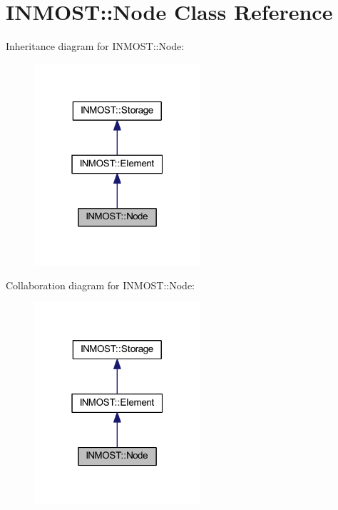 \hypertarget{classINMOST_1_1Node}{\section{I\-N\-M\-O\-S\-T\-:\-:Node Class Reference}
\label{classINMOST_1_1Node}
}


Inheritance diagram for I\-N\-M\-O\-S\-T\-:\-:Node\-:\nopagebreak
\begin{figure}[H]
\begin{center}
\leavevmode
\includegraphics[width=175pt]{classINMOST_1_1Node__inherit__graph}
\end{center}
\end{figure}


Collaboration diagram for I\-N\-M\-O\-S\-T\-:\-:Node\-:\nopagebreak
\begin{figure}[H]
\begin{center}
\leavevmode
\includegraphics[width=175pt]{classINMOST_1_1Node__coll__graph}
\end{center}
\end{figure}
